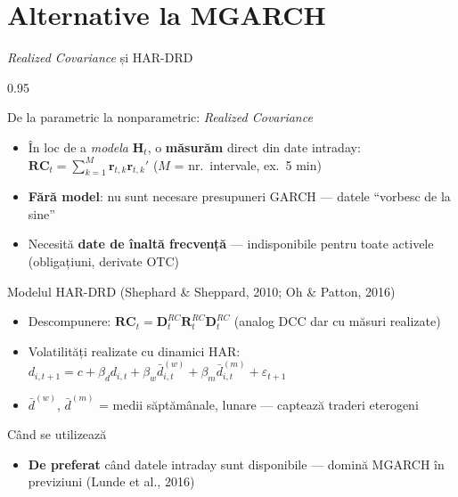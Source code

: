\documentclass[9pt, aspectratio=169, t]{beamer}
\begin{document}
\section{Alternative la MGARCH}

\begin{frame}{\textit{Realized Covariance} și HAR-DRD}
    \begin{cminipage}{0.95\textwidth}
    \vspace{-3mm}
    {\scriptsize
    \begin{block}{De la parametric la nonparametric: \textit{Realized Covariance}}
        \begin{itemize}\setlength{\itemsep}{0pt}
            \item În loc de a \textit{modela} $\mathbf{H}_t$, o \textbf{măsurăm} direct din date intraday: $\mathbf{RC}_t = \sum_{k=1}^{M} \mathbf{r}_{t,k}\mathbf{r}_{t,k}'$ ($M$ = nr.\ intervale, ex.\ 5 min)
            \item \textbf{Fără model}: nu sunt necesare presupuneri GARCH --- datele ``vorbesc de la sine''
            \item Necesită \textbf{date de înaltă frecvență} --- indisponibile pentru toate activele (obligațiuni, derivate OTC)
        \end{itemize}
    \end{block}
    \vspace{-2mm}
    \begin{block}{Modelul HAR-DRD (Shephard \& Sheppard, 2010; Oh \& Patton, 2016)}
        \begin{itemize}\setlength{\itemsep}{0pt}
            \item Descompunere: $\mathbf{RC}_t = \mathbf{D}_t^{RC}\mathbf{R}_t^{RC}\mathbf{D}_t^{RC}$ (analog DCC dar cu măsuri realizate)
            \item Volatilități realizate cu dinamici HAR: $d_{i,t+1} = c + \beta_d d_{i,t} + \beta_w \bar{d}_{i,t}^{(w)} + \beta_m \bar{d}_{i,t}^{(m)} + \varepsilon_{t+1}$
            \item $\bar{d}^{(w)}$, $\bar{d}^{(m)}$ = medii săptămânale, lunare --- captează traderi eterogeni
        \end{itemize}
    \end{block}
    \vspace{-2mm}
    \begin{alertblock}{Când se utilizează}
        \begin{itemize}\setlength{\itemsep}{0pt}
            \item \textbf{De preferat} când datele intraday sunt disponibile --- domină MGARCH în previziuni (Lunde et al., 2016)
        \end{itemize}
    \end{alertblock}
    }
    \end{cminipage}
\end{frame}
\end{document}
